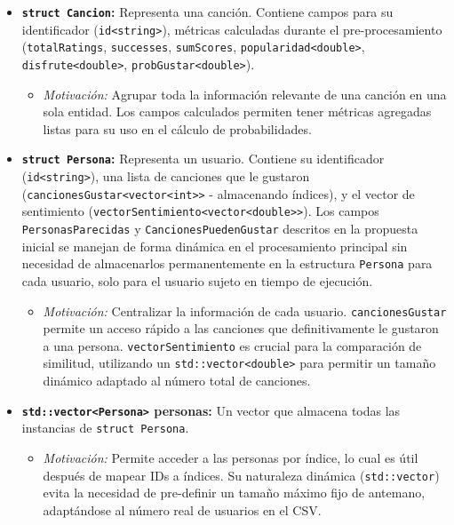\documentclass{article}
\begin{document}
\begin{itemize}[label=\textbullet]
    \item \textbf{\texttt{struct Cancion}:} Representa una canción. Contiene campos para su identificador (\texttt{id\textless{}string\textgreater{}}), métricas calculadas durante el pre-procesamiento (\texttt{totalRatings}, \texttt{successes}, \texttt{sumScores}, \texttt{popularidad\textless{}double\textgreater{}}, \texttt{disfrute\textless{}double\textgreater{}}, \texttt{probGustar\textless{}double\textgreater{}}).
    \begin{itemize}[label=\textendash]
        \item \textit{Motivación:} Agrupar toda la información relevante de una canción en una sola entidad. Los campos calculados permiten tener métricas agregadas listas para su uso en el cálculo de probabilidades.
    \end{itemize}
    \item \textbf{\texttt{struct Persona}:} Representa un usuario. Contiene su identificador (\texttt{id\textless{}string\textgreater{}}), una lista de canciones que le gustaron (\texttt{cancionesGustar\textless{}vector\textless{}int\textgreater{}\textgreater{}} - almacenando índices), y el vector de sentimiento (\texttt{vectorSentimiento\textless{}vector\textless{}double\textgreater{}\textgreater{}}). Los campos \texttt{PersonasParecidas} y \texttt{CancionesPuedenGustar} descritos en la propuesta inicial se manejan de forma dinámica en el procesamiento principal sin necesidad de almacenarlos permanentemente en la estructura \texttt{Persona} para cada usuario, solo para el usuario sujeto en tiempo de ejecución.
    \begin{itemize}[label=\textendash]
        \item \textit{Motivación:} Centralizar la información de cada usuario. \texttt{cancionesGustar} permite un acceso rápido a las canciones que definitivamente le gustaron a una persona. \texttt{vectorSentimiento} es crucial para la comparación de similitud, utilizando un \texttt{std::vector\textless{}double\textgreater{}} para permitir un tamaño dinámico adaptado al número total de canciones.
    \end{itemize}
    \item \textbf{\texttt{std::vector\textless{}Persona\textgreater{}} personas:} Un vector que almacena todas las instancias de \texttt{struct Persona}.
    \begin{itemize}[label=\textendash]
        \item \textit{Motivación:} Permite acceder a las personas por índice, lo cual es útil después de mapear IDs a índices. Su naturaleza dinámica (\texttt{std::vector}) evita la necesidad de pre-definir un tamaño máximo fijo de antemano, adaptándose al número real de usuarios en el CSV.

\end{itemize}
\end{itemize}
\end{document}
